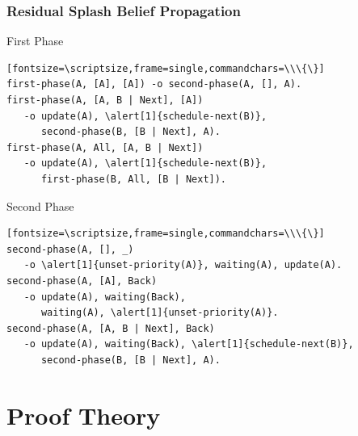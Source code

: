 \documentclass{beamer}
\let\oldalert\alert
\renewcommand{\alert}[2][]{%
  \if\relax\detokenize{#1}\relax%
    \oldalert{#2}%
  \else
    \oldalert<#1>{#2}%
  \fi}
\begin{document}
\begin{frame}[fragile]
   \frametitle{Residual Splash Belief Propagation}
   \begin{block}{First Phase}
   \begin{verbatim}[fontsize=\scriptsize,frame=single,commandchars=\\\{\}]
first-phase(A, [A], [A]) -o second-phase(A, [], A).
first-phase(A, [A, B | Next], [A])
   -o update(A), \alert[1]{schedule-next(B)},
      second-phase(B, [B | Next], A).
first-phase(A, All, [A, B | Next])
   -o update(A), \alert[1]{schedule-next(B)},
      first-phase(B, All, [B | Next]).
   \end{verbatim}
\end{block}
   \begin{block}{Second Phase}
   \begin{verbatim}[fontsize=\scriptsize,frame=single,commandchars=\\\{\}]
second-phase(A, [], _)
   -o \alert[1]{unset-priority(A)}, waiting(A), update(A).
second-phase(A, [A], Back)
   -o update(A), waiting(Back),
      waiting(A), \alert[1]{unset-priority(A)}.
second-phase(A, [A, B | Next], Back)
   -o update(A), waiting(Back), \alert[1]{schedule-next(B)},
      second-phase(B, [B | Next], A).
   \end{verbatim}
\end{block}
\end{frame}

\section{Proof Theory}
\end{document}

